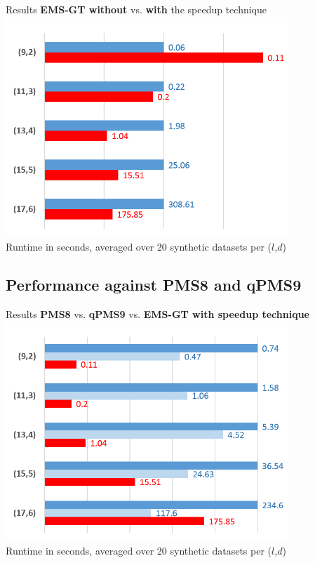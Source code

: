 \documentclass[pdf,xcolor={dvipsnames}]{beamer}
\begin{document}
	\begin{frame}{Results}
		{{\bf EMS-GT \color{blue}without} vs. {\bf\color{red}with} the speedup technique\\}
		{\centering
		\includegraphics[width=0.8\textwidth]{img/results2_large}\\
		\footnotesize Runtime in seconds, averaged over 20 synthetic datasets per ($l$,$d$) \\}
		\end{frame}

	\subsection{Performance against PMS8 and qPMS9}
	\begin{frame}{Results}
		{ {\bf\color{blue}PMS8} vs. {\bf\color{blue}qPMS9} vs. {\bf\color{red}EMS-GT with speedup technique} }
		{\centering \includegraphics[width=0.8\textwidth]{img/results1_large}\\
		\footnotesize Runtime in seconds, averaged over 20 synthetic datasets per ($l$,$d$) \\}

		\end{frame}
\end{document}
